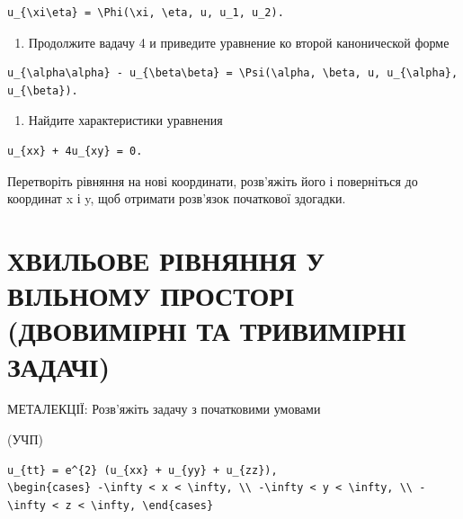 \documentclass[
  ukrainian,
]{article}
\providecommand{\tightlist}{%
  \setlength{\itemsep}{0pt}\setlength{\parskip}{0pt}}
\begin{document}
\begin{verbatim}
u_{\xi\eta} = \Phi(\xi, \eta, u, u_1, u_2).
\end{verbatim}

\begin{enumerate}
\def\labelenumi{\arabic{enumi}.}
\setcounter{enumi}{4}
\tightlist
\item
  Продолжите вадачу 4 и приведите уравнение ко второй канонической форме
\end{enumerate}

\begin{verbatim}
u_{\alpha\alpha} - u_{\beta\beta} = \Psi(\alpha, \beta, u, u_{\alpha}, u_{\beta}).
\end{verbatim}

\begin{enumerate}
\def\labelenumi{\arabic{enumi}.}
\setcounter{enumi}{5}
\tightlist
\item
  Найдите характеристики уравнения
\end{enumerate}

\begin{verbatim}
u_{xx} + 4u_{xy} = 0.
\end{verbatim}

Перетворіть рівняння на нові координати, розв'яжіть його і поверніться
до координат x і y, щоб отримати розв'язок початкової здогадки.

\section{ХВИЛЬОВЕ РІВНЯННЯ У ВІЛЬНОМУ ПРОСТОРІ (ДВОВИМІРНІ ТА ТРИВИМІРНІ
ЗАДАЧІ)}\label{ux445ux432ux438ux43bux44cux43eux432ux435-ux440ux456ux432ux43dux44fux43dux43dux44f-ux443-ux432ux456ux43bux44cux43dux43eux43cux443-ux43fux440ux43eux441ux442ux43eux440ux456-ux434ux432ux43eux432ux438ux43cux456ux440ux43dux456-ux442ux430-ux442ux440ux438ux432ux438ux43cux456ux440ux43dux456-ux437ux430ux434ux430ux447ux456}

МЕТАЛЕКЦІЇ: Розв'яжіть задачу з початковими умовами

(УЧП)

\begin{verbatim}
u_{tt} = e^{2} (u_{xx} + u_{yy} + u_{zz}),
\begin{cases} -\infty < x < \infty, \\ -\infty < y < \infty, \\ -\infty < z < \infty, \end{cases}
\end{verbatim}
\end{document}
